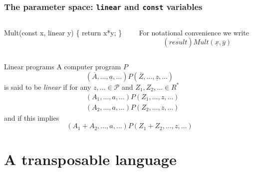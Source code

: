 \documentclass[10pt]{beamer}
\renewcommand{\u}{\underline}
\renewcommand{\o}{\overline}
\begin{document}
\begin{frame}[fragile]
  \frametitle{The parameter space: \texttt{linear} and \texttt{const}
    variables}

  \begin{columns}
    \begin{column}{0.5\textwidth}
      \begin{center}
\begin{semiverbatim}
  Mult(const x, linear y) \{
    return x*y;
  \}
\end{semiverbatim}
      \end{center}
    \end{column}
    \begin{column}{0.5\textwidth}
      For notational convenience we write
      \[(\o{result})Mult(\u{x}, \o{y})\]
    \end{column}
  \end{columns}


  \begin{block}{Linear programs}
    A computer program  $P$
    \[(\o{A}, \ldots, \u{a}, \ldots)P(\o{Z}, \ldots, \u{z}, \ldots)\]
    is said to be \emph{linear} if for any $z,\ldots\in\mathcal{P}$
    and $Z_1,Z_2,\ldots\in R^\ast$
    \begin{align*}
      &(A_1, \ldots, a, \ldots)P(Z_1, \ldots, z, \ldots)\\
      &(A_2, \ldots, a, \ldots)P(Z_2, \ldots, z, \ldots)
    \end{align*}
    and if this implies
    \[(A_1 + A_2, \ldots, a, \ldots)P(Z_1 + Z_2, \ldots, z, \ldots)\]
  \end{block}
\end{frame}


\section{A transposable language}
\end{document}
